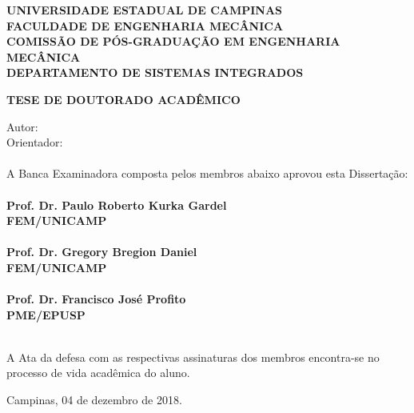 \setcounter{page}{2}

\imprimirfolhaderosto*

 \begin{fichacatalografica}
    \centering
 \end{fichacatalografica}

\newpage
\begin{center}\large\textbf{UNIVERSIDADE ESTADUAL DE CAMPINAS \\
		FACULDADE DE ENGENHARIA MECÂNICA \\
		COMISSÃO DE PÓS-GRADUAÇÃO EM ENGENHARIA MECÂNICA \\
		DEPARTAMENTO DE SISTEMAS INTEGRADOS
		}\end{center}	
\vspace{0cm}	
\begin{center}\textbf{TESE DE DOUTORADO ACADÊMICO}\end{center}
\vspace*{0cm}
\begin{center}
	\Huge\textbf{\imprimirtitulo}
\end{center}
\begin{flushleft}
Autor: \imprimirautor 
\\
Orientador: \imprimirorientador \\
\hfil \\
A Banca Examinadora composta pelos membros abaixo aprovou esta Dissertação:
\\ \hfil \\
\textbf{Prof. Dr. Paulo Roberto Kurka Gardel \\
FEM/UNICAMP \\
\hfil \\
Prof. Dr. Gregory Bregion Daniel  \\
FEM/UNICAMP \\
\hfil \\
Prof. Dr. Francisco José Profito  \\
PME/EPUSP}

\hfil \\
A Ata da defesa com as respectivas assinaturas dos membros encontra-se no processo de vida acadêmica do aluno.
\end{flushleft}
\vspace{0.2cm} 
\begin{flushright}
	Campinas, 04 de dezembro de 2018.
\end{flushright}
\newpage

